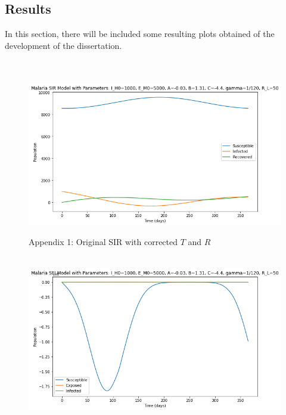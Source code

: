 \documentclass[
	12pt,				%
	oneside,			%
	a4paper,			%
	english,			%
	brazil				%
	]{abntex2}
\begin{document}
\begin{apendicesenv}

\partapendices

\chapter{Results}
In this section, there will be included some resulting plots  
obtained of the development of the dissertation.
\\\\

\begin{figure}[!ht]
	\centering
	\hbox{\hspace{2.0em} \includegraphics[scale=0.55] {THESIS-SIR_T_e_R_adaptados.png}}
	\caption*{Appendix 1: Original SIR with corrected $T$ and $R$}
\end{figure} 
\begin{figure}[!ht]
	\centering
	\hbox{\hspace{2.5em} \includegraphics[scale=0.55] {THESIS-SEI_T_e_R_adaptados.png}}

\end{figure}
\end{apendicesenv}
\end{document}
